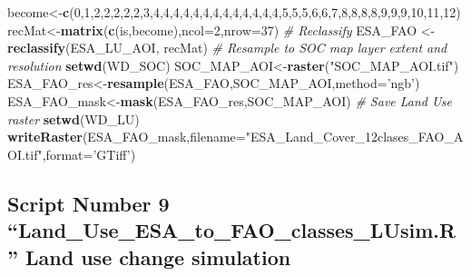 \documentclass[
  10pt,
  b5paper,
]{book}
\newenvironment{Shaded}{\begin{snugshade}}{\end{snugshade}}
\newcommand{\CommentTok}[1]{\textcolor[rgb]{0.56,0.35,0.01}{\textit{#1}}}
\newcommand{\DataTypeTok}[1]{\textcolor[rgb]{0.13,0.29,0.53}{#1}}
\newcommand{\DecValTok}[1]{\textcolor[rgb]{0.00,0.00,0.81}{#1}}
\newcommand{\KeywordTok}[1]{\textcolor[rgb]{0.13,0.29,0.53}{\textbf{#1}}}
\newcommand{\NormalTok}[1]{#1}
\newcommand{\StringTok}[1]{\textcolor[rgb]{0.31,0.60,0.02}{#1}}
\begin{document}
\begin{Shaded}
\begin{Highlighting}[]
\NormalTok{become<-}\KeywordTok{c}\NormalTok{(}\DecValTok{0}\NormalTok{,}\DecValTok{1}\NormalTok{,}\DecValTok{2}\NormalTok{,}\DecValTok{2}\NormalTok{,}\DecValTok{2}\NormalTok{,}\DecValTok{2}\NormalTok{,}\DecValTok{2}\NormalTok{,}\DecValTok{3}\NormalTok{,}\DecValTok{4}\NormalTok{,}\DecValTok{4}\NormalTok{,}\DecValTok{4}\NormalTok{,}\DecValTok{4}\NormalTok{,}\DecValTok{4}\NormalTok{,}\DecValTok{4}\NormalTok{,}\DecValTok{4}\NormalTok{,}\DecValTok{4}\NormalTok{,}\DecValTok{4}\NormalTok{,}\DecValTok{4}\NormalTok{,}\DecValTok{4}\NormalTok{,}\DecValTok{4}\NormalTok{,}\DecValTok{4}\NormalTok{,}\DecValTok{5}\NormalTok{,}\DecValTok{5}\NormalTok{,}\DecValTok{5}\NormalTok{,}\DecValTok{6}\NormalTok{,}\DecValTok{6}\NormalTok{,}\DecValTok{7}\NormalTok{,}\DecValTok{8}\NormalTok{,}\DecValTok{8}\NormalTok{,}\DecValTok{8}\NormalTok{,}\DecValTok{8}\NormalTok{,}\DecValTok{9}\NormalTok{,}\DecValTok{9}\NormalTok{,}\DecValTok{9}\NormalTok{,}\DecValTok{10}\NormalTok{,}\DecValTok{11}\NormalTok{,}\DecValTok{12}\NormalTok{)}
\NormalTok{recMat<-}\KeywordTok{matrix}\NormalTok{(}\KeywordTok{c}\NormalTok{(is,become),}\DataTypeTok{ncol=}\DecValTok{2}\NormalTok{,}\DataTypeTok{nrow=}\DecValTok{37}\NormalTok{)}
\CommentTok{# Reclassify}
\NormalTok{ESA_FAO <-}\StringTok{ }\KeywordTok{reclassify}\NormalTok{(ESA_LU_AOI, recMat)}
\CommentTok{# Resample to SOC map layer extent and resolution}
\KeywordTok{setwd}\NormalTok{(WD_SOC)}
\NormalTok{SOC_MAP_AOI<-}\KeywordTok{raster}\NormalTok{(}\StringTok{"SOC_MAP_AOI.tif"}\NormalTok{)}
\NormalTok{ESA_FAO_res<-}\KeywordTok{resample}\NormalTok{(ESA_FAO,SOC_MAP_AOI,}\DataTypeTok{method=}\StringTok{'ngb'}\NormalTok{) }
\NormalTok{ESA_FAO_mask<-}\KeywordTok{mask}\NormalTok{(ESA_FAO_res,SOC_MAP_AOI) }
\CommentTok{# Save Land Use raster}
\KeywordTok{setwd}\NormalTok{(WD_LU)}
\KeywordTok{writeRaster}\NormalTok{(ESA_FAO_mask,}\DataTypeTok{filename=}\StringTok{"ESA_Land_Cover_12clases_FAO_AOI.tif"}\NormalTok{,}\DataTypeTok{format=}\StringTok{'GTiff'}\NormalTok{)}
\end{Highlighting}
\end{Shaded}

\hypertarget{script-number-9-land_use_esa_to_fao_classes_lusim.r-land-use-change-simulation}{%
\subsection{Script Number 9 ``Land\_Use\_ESA\_to\_FAO\_classes\_LUsim.R'' Land use change simulation}\label{script-number-9-land_use_esa_to_fao_classes_lusim.r-land-use-change-simulation}}
\end{document}
